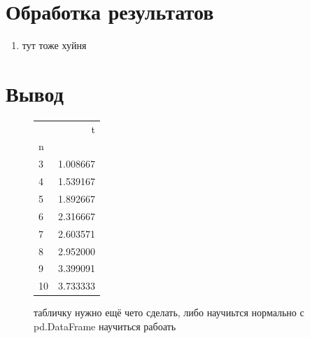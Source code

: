 \documentclass[11pt, a4paper]{article}
\begin{document}
\section*{Обработка результатов}\begin{enumerate}
  \item тут тоже хуйня
\end{enumerate}


\section*{Вывод}
\begin{figure}[H]
  
  \begin{tabular}{lr}
    \toprule
    {} &         t \\
  n  &           \\
  \midrule
  3  &  1.008667 \\
  4  &  1.539167 \\
  5  &  1.892667 \\
  6  &  2.316667 \\
  7  &  2.603571 \\
  8  &  2.952000 \\
  9  &  3.399091 \\
  10 &  3.733333 \\
  \bottomrule
\end{tabular}
\caption{табличку нужно ещё чето сделать, либо научиьтся нормально с pd.DataFrame научиться рабоать}
\end{figure}
\end{document}
